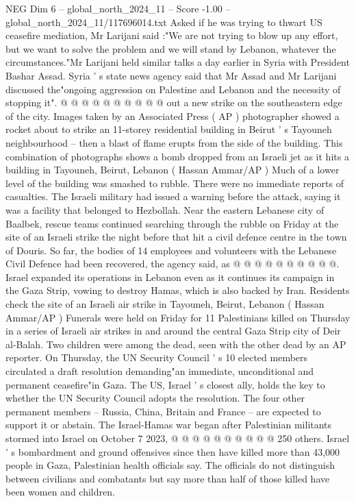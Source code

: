 \begin{textsample}{NEG Dim 6 – global\_north\_2024\_11 – Score -1.00 – global\_north\_2024\_11/117696014.txt}
Asked if he was trying to thwart US ceasefire mediation, Mr Larijani said :"We are not trying to blow up any effort, but we want to solve the problem and we will stand by Lebanon, whatever the circumstances."Mr Larijani held similar talks a day earlier in Syria with President Bashar Assad.
Syria ' s state news agency said that Mr Assad and Mr Larijani discussed the"ongoing aggression on Palestine and Lebanon and the necessity of stopping it". @ @ @ @ @ @ @ @ @ @ out a new strike on the southeastern edge of the city.
Images taken by an Associated Press ( AP ) photographer showed a rocket about to strike an 11-storey residential building in Beirut ' s Tayouneh neighbourhood -- then a blast of flame erupts from the side of the building.
This combination of photographs shows a bomb dropped from an Israeli jet as it hits a building in Tayouneh, Beirut, Lebanon ( Hassan Ammar/AP ) Much of a lower level of the building was smashed to rubble.
There were no immediate reports of casualties.
The Israeli military had issued a warning before the attack, saying it was a facility that belonged to Hezbollah.
Near the eastern Lebanese city of Baalbek, rescue teams continued searching through the rubble on Friday at the site of an Israeli strike the night before that hit a civil defence centre in the town of Douris.
So far, the bodies of 14 employees and volunteers with the Lebanese Civil Defence had been recovered, the agency said, as @ @ @ @ @ @ @ @ @ @.
Israel expanded its operations in Lebanon even as it continues its campaign in the Gaza Strip, vowing to destroy Hamas, which is also backed by Iran.
Residents check the site of an Israeli air strike in Tayouneh, Beirut, Lebanon ( Hassan Ammar/AP ) Funerals were held on Friday for 11 Palestinians killed on Thursday in a series of Israeli air strikes in and around the central Gaza Strip city of Deir al-Balah.
Two children were among the dead, seen with the other dead by an AP reporter.
On Thursday, the UN Security Council ' s 10 elected members circulated a draft resolution demanding"an immediate, unconditional and permanent ceasefire"in Gaza.
The US, Israel ' s closest ally, holds the key to whether the UN Security Council adopts the resolution.
The four other permanent members -- Russia, China, Britain and France -- are expected to support it or abstain.
The Israel-Hamas war began after Palestinian militants stormed into Israel on October 7 2023, @ @ @ @ @ @ @ @ @ @ 250 others.
Israel ' s bombardment and ground offensives since then have killed more than 43,000 people in Gaza, Palestinian health officials say.
The officials do not distinguish between civilians and combatants but say more than half of those killed have been women and children.

\end{textsample}
